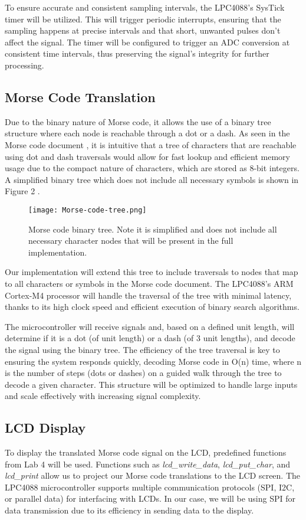 \documentclass{cce2014-design}
\begin{document}
To ensure accurate and consistent sampling intervals, the LPC4088’s SysTick timer will be utilized. This will trigger periodic interrupts, ensuring that the sampling happens at precise intervals and that short, unwanted pulses don’t affect the signal. The timer will be configured to trigger an ADC conversion at consistent time intervals, thus preserving the signal’s integrity for further processing.

\subsection{Morse Code Translation}
Due to the binary nature of Morse code, it allows the use of a binary tree structure where each node is reachable through a dot or a dash. As seen in the Morse code document \cite{itu2009}, it is intuitive that a tree of characters that are reachable using dot and dash traversals would allow for fast lookup and efficient memory usage due to the compact nature of characters, which are stored as 8-bit integers. A simplified binary tree which does not include all necessary symbols is shown in Figure 2 \cite{morsecode-tree}.

\begin{figure}[h]
    \centering
    \texttt{[image: Morse-code-tree.png]}
    \caption{Morse code binary tree. Note it is simplified and does not include all necessary character nodes that will be present in the full implementation.}
    \label{fig:morse_tree}
\end{figure}

Our implementation will extend this tree to include traversals to nodes that map to all characters or symbols in the Morse code document. The LPC4088's ARM Cortex-M4 processor will handle the traversal of the tree with minimal latency, thanks to its high clock speed and efficient execution of binary search algorithms.

The microcontroller will receive signals and, based on a defined unit length, will determine if it is a dot (of unit length) or a dash (of 3 unit lengths), and decode the signal using the binary tree. The efficiency of the tree traversal is key to ensuring the system responds quickly, decoding Morse code in O(n) time, where n is the number of steps (dots or dashes) on a guided walk through the tree to decode a given character. This structure will be optimized to handle large inputs and scale effectively with increasing signal complexity.

\subsection{LCD Display}
To display the translated Morse code signal on the LCD, predefined functions from Lab 4 will be used. Functions such as \textit{lcd\_write\_data}, \textit{lcd\_put\_char}, and \textit{lcd\_print} allow us to project our Morse code translations to the LCD screen. The LPC4088 microcontroller supports multiple communication protocols (SPI, I2C, or parallel data) for interfacing with LCDs. In our case, we will be using SPI for data transmission due to its efficiency in sending data to the display.
\end{document}
